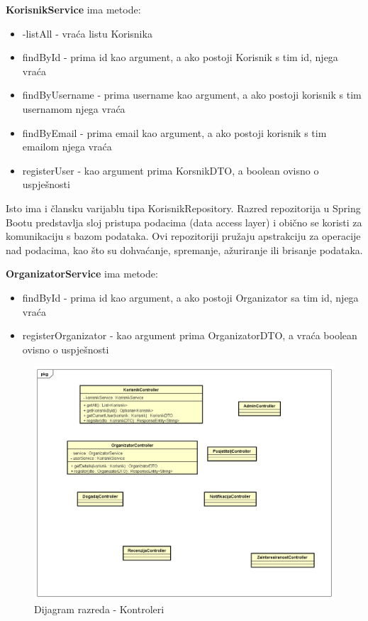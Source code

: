 			\textbf{KorisnikService} ima metode: 
			\begin{itemize}
				\item  -listAll - vraća listu Korisnika
				\item findById - prima id kao argument, a ako postoji Korisnik s tim id, njega vraća
				\item findByUsername - prima username kao argument, a ako postoji korisnik s tim usernamom njega vraća
				\item findByEmail - prima email kao argument, a ako postoji korisnik s tim emailom njega vraća
				\item registerUser - kao argument prima KorsnikDTO, a boolean ovisno o uspješnosti
			\end{itemize}
			
			Isto ima i člansku varijablu tipa KorisnikRepository. Razred repozitorija u Spring Bootu predstavlja sloj pristupa podacima (data access layer) i obično se koristi za komunikaciju s bazom podataka. Ovi repozitoriji pružaju apstrakciju za operacije nad podacima, kao što su dohvaćanje, spremanje, ažuriranje ili brisanje podataka.
			\newline
			
			\textbf{OrganizatorService} ima metode: 
			\begin{itemize}
				\item findById - prima id kao argument, a ako postoji Organizator sa tim id, njega vraća
				\item registerOrganizator - kao argument prima OrganizatorDTO, a vraća boolean ovisno o uspješnosti
			\end{itemize}
			
			\begin{figure}[H]
				\includegraphics[scale=0.5]{dijagramiKlasa/Dijagram razreda - Kontroleri.png} %
				\centering
				\caption{Dijagram razreda - Kontroleri}
				\label{fig:promjene}
			\end{figure}
			
